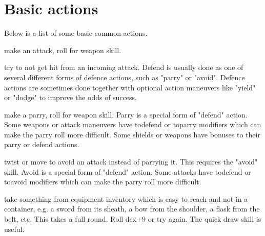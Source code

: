 















\section*{Basic actions}


Below is a list of some basic common actions.

\openactionslist


 make an attack, roll for weapon skill.


 try to not get hit from an incoming attack. Defend is usually done as one of several different forms of defence actions, such as "parry" or "avoid". Defence actions are sometimes done together with optional action maneuvers like "yield" or "dodge" to improve the odds of success.


 make a parry, roll for weapon skill.
Parry is a special form of "defend" action. Some weapons or attack maneuvers have todefend or toparry modifiers which can make the parry roll more difficult. Some shields or weapons have bonuses to their parry or defend actions.


 twist or move to avoid an attack instead of parrying it. This requires the "avoid" skill. Avoid is a special form of "defend" action. Some attacks have todefend or toavoid modifiers which can make the parry roll more difficult.


 take something from equipment inventory which is easy to reach and not in a container, e.g. a sword from its sheath, a bow from the shoulder, a flask from the belt, etc. This takes a full round. Roll dex+9 or try again. The quick draw skill is useful.


